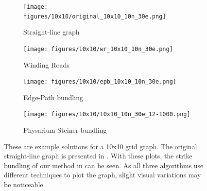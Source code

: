 \begin{figure}[H]
    \begin{subfigure}{0.5\linewidth}
        \centering
        \texttt{[image: figures/10x10/original\_10x10\_10n\_30e.png]}
        \caption{Straight-line graph}
        \label{fig:original_10x10}
    \end{subfigure}
    \begin{subfigure}{0.5\linewidth}
        \centering
        \texttt{[image: figures/10x10/wr\_10x10\_10n\_30e.png]}
        \caption{Winding Roads}
        \label{fig:wr_10x10}
    \end{subfigure}
    \begin{subfigure}{0.5\linewidth}
        \centering
        \texttt{[image: figures/10x10/epb\_10x10\_10n\_30e.png]}
        \caption{Edge-Path bundling}
        \label{fig:epb_10x10}
    \end{subfigure}
    \begin{subfigure}{0.5\linewidth}
        \centering
        \texttt{[image: figures/10x10/10x10\_10n\_30e\_12-1000.png]}
        \caption{Physarium Steiner bundling}
        \label{fig:10x10}
    \end{subfigure}
  \caption{These are example solutions for a 10x10 grid graph. The original straight-line graph is presented in . With these plots, the strike bundling of our method in  can be seen.
  As all three algorithms use different techniques to plot the graph, slight visual variations may be noticeable.}
  \label{fig:10x10_figure}
\end{figure}

